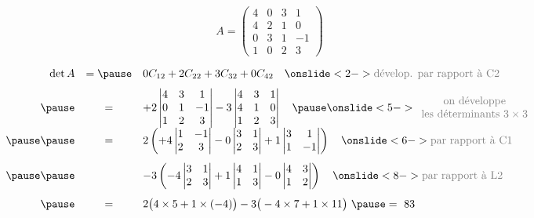 \begin{frame}

\begin{exemple}
$$A = \begin{pmatrix}
4 & 0 & 3 & 1\\
4 & 2 & 1 & 0\\
0 & 3 & 1 & -1\\
1 & 0 & 2 & 3
\end{pmatrix}
$$

\vspace{-10pt}
\pause

$$\begin{array}{rcl}
\det A 
  & = \pause & 0 C_{12} + 2 C_{22} + 3 C_{32}+0 C_{42} \quad \onslide<2->\color{gray}\text{dévelop. par rapport à C2} \\[7pt]
\pause   & = & +2 \begin{vmatrix}4&3&1\\0&1&-1\\1&2&3 \end{vmatrix}
        -3 \begin{vmatrix}4&3&1\\4&1&0\\1&2&3\\ \end{vmatrix} \quad   \pause
   \onslide<5->\begin{array}{c}
   \color{gray}\text{on développe} \\ \color{gray}\text{les déterminants $3\times 3$}
   \end{array}
    \\[7pt]
\pause\pause
  & = & 2 \left(+4\begin{vmatrix}1&-1\\2&3\end{vmatrix}-0\begin{vmatrix}3&1\\2&3\end{vmatrix}
  +1\begin{vmatrix}3&1\\1&-1\end{vmatrix}\right) \quad  \onslide<6->\color{gray}\text{par rapport à C1}\\[14pt]
\pause\pause
  &   & -3\left(-4\begin{vmatrix}3&1\\2&3\end{vmatrix}+1\begin{vmatrix}4&1\\1&3\end{vmatrix}
  -0\begin{vmatrix}4&3\\1&2\end{vmatrix}\right)\quad \onslide<8->\color{gray}\text{par rapport à L2}\\[14pt]
\pause & = & 2 \big(4\times 5 +1\times(-4)\big) 
 		-3\big(-4\times7 +1\times11  \big) \ \pause = \ 83\\
\end{array}$$
\end{exemple} 


\end{frame}


